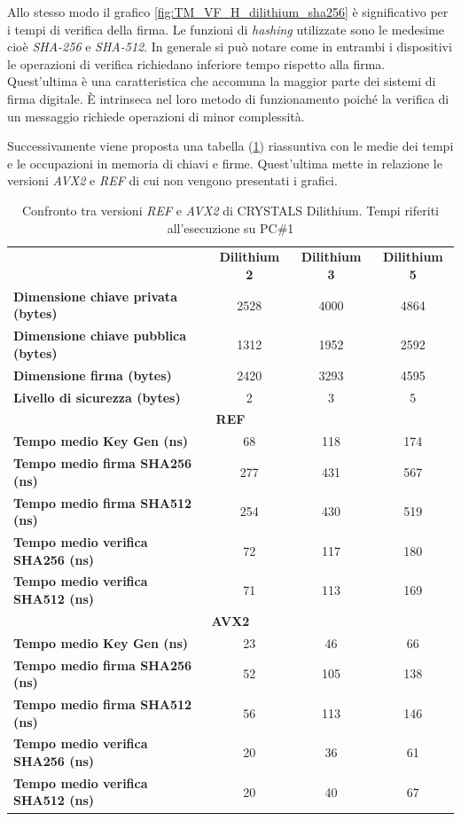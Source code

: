 Allo stesso modo il grafico \ref{fig:TM_VF_H_dilithium_sha256} è significativo per i tempi di verifica della firma. Le funzioni di \textit{hashing} utilizzate sono le medesime cioè \textit{SHA-256} e \textit{SHA-512}. In generale si può notare come in entrambi i dispositivi le operazioni di verifica richiedano inferiore tempo rispetto alla firma. Quest'ultima è una caratteristica che accomuna la maggior parte dei sistemi di firma digitale. È intrinseca nel loro metodo di funzionamento poiché la verifica di un messaggio richiede operazioni di minor complessità.

Successivamente viene proposta una tabella (\ref{tab:dilithium_comparison}) riassuntiva con le medie dei tempi e le occupazioni in memoria di chiavi e firme. Quest'ultima mette in relazione le versioni \textit{AVX2} e \textit{REF} di cui non vengono presentati i grafici.

\begin{table}[H]
    \centering
    \begin{tabular}{lccc}
        \toprule
        & \textbf{Dilithium 2} & \textbf{Dilithium 3} & \textbf{Dilithium 5} \\
        \cmidrule(lr){1-4}
        \textbf{Dimensione chiave privata (bytes)} & 2528 & 4000 & 4864 \\
        \textbf{Dimensione chiave pubblica (bytes)} & 1312 & 1952 & 2592 \\
        \textbf{Dimensione firma (bytes)} & 2420 & 3293 & 4595 \\
        \textbf{Livello di sicurezza (bytes)} & 2 & 3 & 5 \\
        \midrule
        \multicolumn{4}{c}{\textbf{REF}} \\
        \cmidrule(lr){1-4}
        \textbf{Tempo medio Key Gen (ns)} & 68 & 118 & 174 \\
        \textbf{Tempo medio firma SHA256 (ns)} & 277 & 431 & 567 \\
        \textbf{Tempo medio firma SHA512 (ns)} & 254 & 430 & 519 \\
        \textbf{Tempo medio verifica SHA256 (ns)} & 72 & 117 & 180 \\
        \textbf{Tempo medio verifica SHA512 (ns)} & 71 & 113 & 169 \\
        \midrule
        \multicolumn{4}{c}{\textbf{AVX2}} \\
        \cmidrule(lr){1-4}
        \textbf{Tempo medio Key Gen (ns)} & 23 & 46 & 66 \\
        \textbf{Tempo medio firma SHA256 (ns)} & 52 & 105 & 138 \\
        \textbf{Tempo medio firma SHA512 (ns)} & 56 & 113 & 146 \\
        \textbf{Tempo medio verifica SHA256 (ns)} & 20 & 36 & 61 \\
        \textbf{Tempo medio verifica SHA512 (ns)} & 20 & 40 & 67 \\
        \bottomrule
    \end{tabular}
    \caption{Confronto tra versioni \textit{REF} e \textit{AVX2} di CRYSTALS Dilithium. Tempi riferiti all'esecuzione su PC\#1}
    \label{tab:dilithium_comparison}
\end{table}



